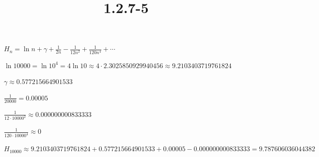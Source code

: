 \documentclass{article}
\title{1.2.7-5}
\begin{document}
\maketitle

$H_n = \ln{n} + \gamma + \frac{1}{2n} - \frac{1}{12n^2} + \frac{1}{120n^4} + \cdots$

$\ln 10000 = \ln 10^4 = 4 \ln{10} \approx 4 \cdot 2.3025850929940456 \approx 9.2103403719761824$

$\gamma \approx 0.577215664901533$

$\frac{1}{20000} = 0.00005$

$\frac{1}{12 \cdot 10000^2} \approx 0.000000000833333$

$\frac{1}{120 \cdot 10000^4} \approx 0$

$H_{10000} \approx 9.2103403719761824 + 0.577215664901533 + 0.00005 - 0.000000000833333 = 9.787606036044382$
\end{document}
